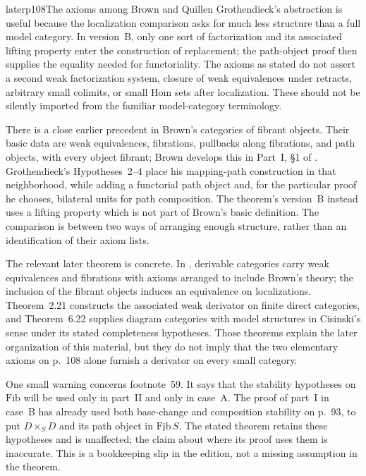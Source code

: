 \begin{dcomment}{later}{p108}{The axioms among Brown and Quillen}
Grothendieck's abstraction is useful because the localization comparison asks for much less structure than a full model category. In version~B, only one sort of factorization and its associated lifting property enter the construction of replacement; the path-object proof then supplies the equality needed for functoriality. The axioms as stated do not assert a second weak factorization system, closure of weak equivalences under retracts, arbitrary small colimits, or small Hom sets after localization. These should not be silently imported from the familiar model-category terminology.

There is a close earlier precedent in Brown's categories of fibrant objects. Their basic data are weak equivalences, fibrations, pullbacks along fibrations, and path objects, with every object fibrant; Brown develops this in Part~I, \S1 of \citet{Brown1973}. Grothendieck's Hypotheses~2--4 place his mapping-path construction in that neighborhood, while adding a functorial path object and, for the particular proof he chooses, bilateral units for path composition. The theorem's version~B instead uses a lifting property which is not part of Brown's basic definition. The comparison is between two ways of arranging enough structure, rather than an identification of their axiom lists.

The relevant later theorem is concrete. In \citet[Definition~1.1 and Proposition~1.8]{Cisinski2010}, derivable categories carry weak equivalences and fibrations with axioms arranged to include Brown's theory; the inclusion of the fibrant objects induces an equivalence on localizations. Theorem~2.21 constructs the associated weak derivator on finite direct categories, and Theorem~6.22 supplies diagram categories with model structures in Cisinski's sense under its stated completeness hypotheses. Those theorems explain the later organization of this material, but they do not imply that the two elementary axioms on p.~108 alone furnish a derivator on every small category.

One small warning concerns footnote~59. It says that the stability hypotheses on $\mathrm{Fib}$ will be used only in part~II and only in case~A. The proof of part~I in case~B has already used both base-change and composition stability on p.~93, to put $D\times_SD$ and its path object in $\underline{\mathrm{Fib}}\,S$. The stated theorem retains these hypotheses and is unaffected; the claim about where its proof uses them is inaccurate. This is a bookkeeping slip in the edition, not a missing assumption in the theorem.
\end{dcomment}

